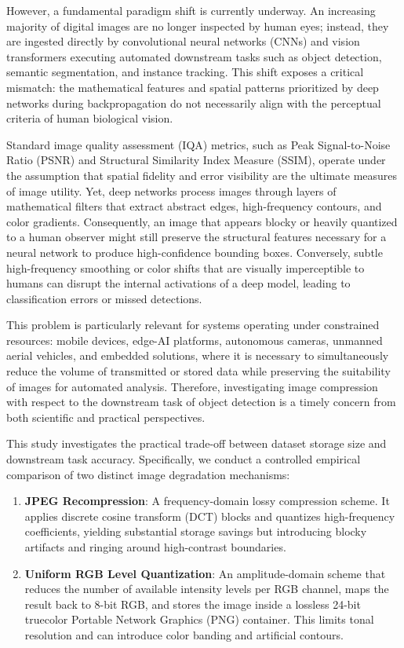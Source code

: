 \documentclass[12pt, a4paper]{article}
\begin{document}
However, a fundamental paradigm shift is currently underway. An increasing majority of digital images are no longer inspected by human eyes; instead, they are ingested directly by convolutional neural networks (CNNs) and vision transformers executing automated downstream tasks such as object detection, semantic segmentation, and instance tracking. This shift exposes a critical mismatch: the mathematical features and spatial patterns prioritized by deep networks during backpropagation do not necessarily align with the perceptual criteria of human biological vision.

Standard image quality assessment (IQA) metrics, such as Peak Signal-to-Noise Ratio (PSNR) and Structural Similarity Index Measure (SSIM), operate under the assumption that spatial fidelity and error visibility are the ultimate measures of image utility. Yet, deep networks process images through layers of mathematical filters that extract abstract edges, high-frequency contours, and color gradients. Consequently, an image that appears blocky or heavily quantized to a human observer might still preserve the structural features necessary for a neural network to produce high-confidence bounding boxes. Conversely, subtle high-frequency smoothing or color shifts that are visually imperceptible to humans can disrupt the internal activations of a deep model, leading to classification errors or missed detections.

This problem is particularly relevant for systems operating under constrained resources: mobile devices, edge-AI platforms, autonomous cameras, unmanned aerial vehicles, and embedded solutions, where it is necessary to simultaneously reduce the volume of transmitted or stored data while preserving the suitability of images for automated analysis. Therefore, investigating image compression with respect to the downstream task of object detection is a timely concern from both scientific and practical perspectives.

This study investigates the practical trade-off between dataset storage size and downstream task accuracy. Specifically, we conduct a controlled empirical comparison of two distinct image degradation mechanisms:
\begin{enumerate}
    \item \textbf{JPEG Recompression}: A frequency-domain lossy compression scheme. It applies discrete cosine transform (DCT) blocks and quantizes high-frequency coefficients, yielding substantial storage savings but introducing blocky artifacts and ringing around high-contrast boundaries.
    \item \textbf{Uniform RGB Level Quantization}: An amplitude-domain scheme that reduces the number of available intensity levels per RGB channel, maps the result back to 8-bit RGB, and stores the image inside a lossless 24-bit truecolor Portable Network Graphics (PNG) container. This limits tonal resolution and can introduce color banding and artificial contours.
\end{enumerate}
\end{document}
